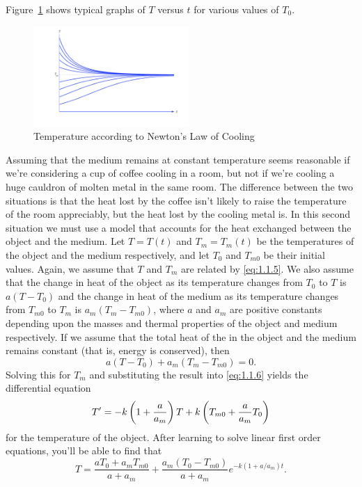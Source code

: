 \documentclass{ximera}
\begin{document}
Figure~\ref{figure:1.1.2} shows typical graphs of $T$ versus $t$ for
various values of  $T_0$.

\begin{center}
\begin{figure}
  \includegraphics[height=1.5in]{fig010102.jpg}
  \caption{ Temperature according to Newton's Law of Cooling}
  \label{figure:1.1.2}
\end{figure}
\end{center}

Assuming that the medium remains at constant temperature seems 
reasonable if we're considering a cup of coffee cooling in a room, but
 not if we're cooling a huge cauldron of molten
metal in the same room. The difference between the two situations is
that the heat lost by the coffee isn't likely to raise the
temperature of the room appreciably, but the heat lost by the
cooling metal is. In this second situation we must use a model that
accounts for the heat exchanged between the object and the medium. Let
$T=T(t)$ and $T_m=T_m(t)$ be the temperatures of the object and the
medium respectively, and let $T_0$ and $T_{m0}$ be their initial
values. Again, we assume that $T$ and $T_m$ are related by
\eqref{eq:1.1.5}. We also assume that the change in heat of
the object as its temperature changes from $T_0$ to $T$ is $a(T-T_0)$
and  the change in heat of the medium as its temperature changes
from $T_{m0}$ to $T_m$ is $a_m(T_m-T_{m0})$, where $a$ and $a_m$ are
positive constants depending upon the masses and thermal properties of
the object and medium respectively. If we assume that the total heat
of the in the object and the medium remains constant
(that is, energy is conserved), then
$$
a(T-T_0)+a_m(T_m-T_{m0})=0.
$$
Solving this for  $T_m$  and substituting the result into
\eqref{eq:1.1.6} yields the differential equation
$$
T'=-k\left(1+{a\over a_m}\right)T
+k\left(T_{m0}+{a\over a_m}T_0\right)
$$
for the temperature of the object.  After learning to solve linear
first order  equations, you'll be able to find that
$$
T=\frac{aT_0+a_mT_{m0}}
{a+a_m}+\frac{a_m(T_0-T_{m0})}{a+a_m}e^{-k(1+a/a_m)t}.
$$
\end{document}
